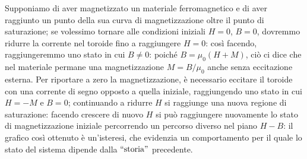 %
Supponiamo di aver magnetizzato un materiale ferromagnetico e di aver raggiunto un punto della sua curva di magnetizzazione oltre il punto di saturazione; se volessimo tornare alle condizioni iniziali $ H = 0 $, $ B = 0 $, dovremmo ridurre la corrente nel toroide fino a raggiungere $ H = 0 $: così facendo, raggiungeremmo uno stato in cui $ B \neq 0 $: poiché $ B = \mu_0 (H + M) $, ciò ci dice che nel materiale permane una magnetizzazione $ M = B / \mu_0 $ anche senza eccitazione esterna. Per riportare a zero la magnetizzazione, è necessario eccitare il toroide con una corrente di segno opposto a quella iniziale, raggiungendo uno stato in cui $ H = - M $ e $ B = 0 $; continuando a ridurre $ H $ si raggiunge una nuova regione di saturazione: facendo crescere di nuovo $ H $ si può raggiungere nuovamente lo stato di magnetizzazione iniziale percorrendo un percorso diverso nel piano $ H - B $: il grafico così ottenuto è un'isteresi, che evidenzia un comportamento per il quale lo stato del sistema dipende dalla $ ``\text{storia}" $ precedente.
